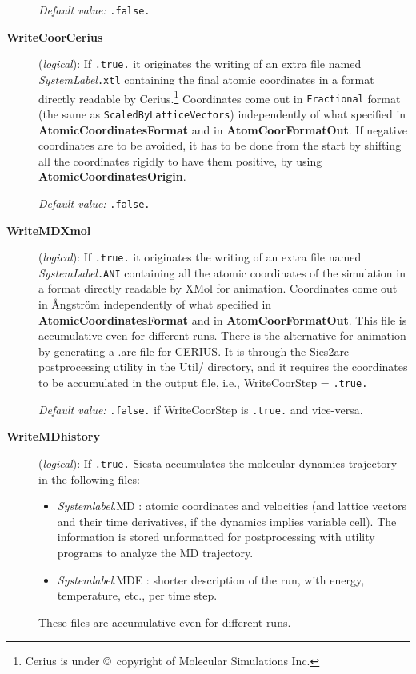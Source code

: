 \documentclass[11pt]{article}
\begin{document}
\begin{description}
{\it Default value:} {\tt .false.}
        

\item[{\bf WriteCoorCerius}] ({\it logical}): 
If {\tt .true.} it originates the writing of an extra file
named {\it SystemLabel}{\tt .xtl} containing the final atomic
coordinates in a format directly readable by {\sc Cerius}.\footnote{{\sc 
Cerius} is under \copyright\ copyright of Molecular Simulations Inc.} 
Coordinates come out in 
{\tt Fractional} format (the same as {\tt ScaledByLatticeVectors})
independently of what specified in {\bf AtomicCoordinatesFormat} and
in {\bf AtomCoorFormatOut}.
If negative coordinates are to be avoided, it has to be 
done from the start by shifting all the coordinates rigidly
to have them positive, by using {\bf AtomicCoordinatesOrigin}.

{\it Default value:} {\tt .false.}

 
\item[{\bf WriteMDXmol}] ({\it logical}):
If {\tt .true.} it originates the writing of an extra file
named {\it SystemLabel}{\tt .ANI} containing all the atomic
coordinates of the simulation in a format directly readable by 
{\sc XMol} for animation. Coordinates come out in 
{\AA}ngstr\"om independently of what specified in 
{\bf AtomicCoordinatesFormat} and in {\bf AtomCoorFormatOut}.
This file is accumulative even for different runs.
There is the alternative for animation by generating a .arc file for 
CERIUS. It is through the {\sc Sies2arc} 
postprocessing utility 
in the Util/ directory, and it requires the coordinates to be
accumulated in the output file, i.e., WriteCoorStep = {\tt .true.}
 
{\it Default value:} {\tt .false.} if WriteCoorStep is {\tt .true.}
and vice-versa.

 
\item[{\bf WriteMDhistory}] ({\it logical}):
If {\tt .true.} {\sc Siesta} accumulates the molecular dynamics
trajectory in the following files:
\begin{itemize}
\item
{\it Systemlabel}.MD : atomic coordinates and velocities (and
lattice vectors and their time derivatives, if the dynamics implies
variable cell). The information is stored unformatted for postprocessing
with utility programs to analyze the MD trajectory. 
\item
{\it Systemlabel}.MDE : shorter description of the run, with energy,
temperature, etc., per time step.
\end{itemize}
These files are accumulative even for different runs.
 

\end{description}
\end{document}
